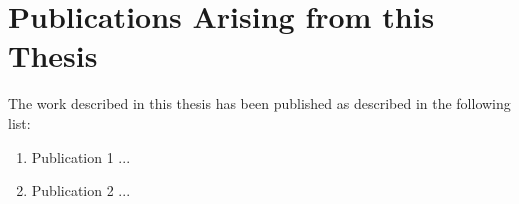 \cleardoublepage
\chapter*{Publications Arising from this Thesis}
\vspace{-0.5cm}

The work described in this thesis has been published as described in the following list:
\begin{enumerate}
	\item Publication 1 ...

    \item Publication 2 ...
\end{enumerate}

\cleardoublepage
\tableofcontents

\cleardoublepage
\listoffigures

\cleardoublepage
\listoftables

\cleardoublepage

\onehalfspacing
